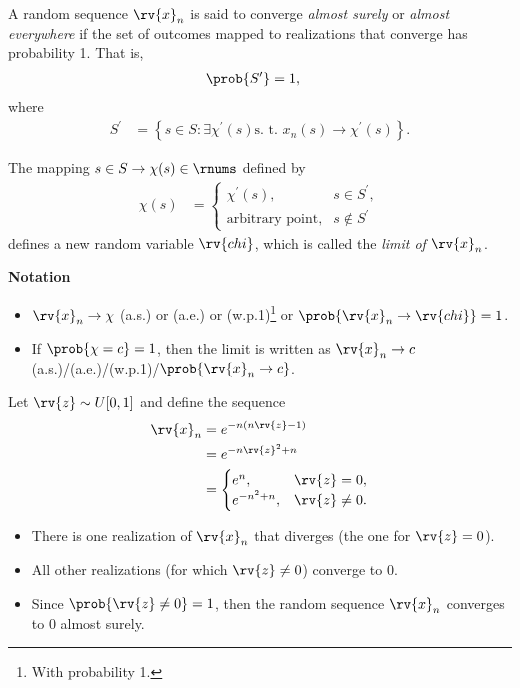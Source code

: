 \begin{definitionBox}
  A random sequence $\rv{x}_{n}$ is said to converge \emph{almost surely} or \emph{almost everywhere} if the set of outcomes mapped to realizations that converge has probability 1. That is,
  \begin{align}
      \prob{S^{\prime}} &= 1,
  \end{align}
  where
  \begin{align}
      S^{\prime} &= \left\{ s\in S : \exists \chi^{\prime}(s) \text{s.~t.~}x_{n}(s)\to\chi^{\prime}(s) \right\}.
  \end{align}
\end{definitionBox}

\begin{remarkBox}
    The mapping $s\in S\to\chi(s)\in\rnums$ defined by
    \begin{align}
        \chi(s) &= 
        \begin{cases}
            \chi^{\prime}(s), & s\in S^{\prime},\\
            \text{arbitrary point}, & s\not\in S^{\prime}
        \end{cases}
    \end{align}
    defines a new random variable $\rv{chi}$, which is called the \emph{limit of $\rv{x}_{n}$}.

    \textbf{Notation}
    \begin{itemize}
        \item $\rv{x}_{n}\to\chi$ (a.s.) or (a.e.) or (w.p.1)\footnote{With probability 1.} or $\prob{\rv{x}_{n}\to\rv{chi}}=1$.
        \item If $\prob{\chi=c}=1$, then the limit is written as $\rv{x}_{n}\to c$ (a.s.)/(a.e.)/(w.p.1)/$\prob{\rv{x}_{n}\to c}$.
    \end{itemize}
\end{remarkBox}
\begin{example}
    Let $\rv{z}\sim U[0,1]$ and define the sequence
    \begin{align}
        \rv{x}_{n} &= e^{-n(n\rv{z}-1)}\\
        &= e^{-n\rv{z}^{2}+n}\\
        &= 
        \begin{cases}
            e^{n}, & \rv{z}=0,\\
            e^{-n^{2}+n}, &\rv{z}\neq 0.
        \end{cases}
    \end{align}
    \begin{itemize}
        \item There is one realization of $\rv{x}_{n}$ that diverges (the one for $\rv{z}=0$).
        \item All other realizations (for which $\rv{z}\neq 0$) converge to $0$.
        \item Since $\prob{\rv{z}\neq 0} = 1$, then the random sequence $\rv{x}_{n}$ converges to $0$ almost surely.
    \end{itemize}
\end{example}


